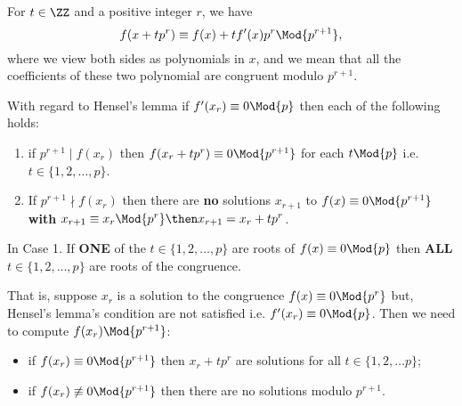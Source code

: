 \documentclass[12pt, a4paper]{article}
\begin{document}

\begin{lemma}
    For \(t\in \ZZ\) and a positive integer \(r\), we have
    \[f(x+tp^r) \equiv f(x)+tf'(x)p^r \Mod{p^{r+1}},\]
    where we view both sides as polynomials in \(x\), and we mean that all the coefficients of these two polynomial are congruent modulo \(p^{r+1}\).
\end{lemma}

\begin{mdthm}
    With regard to Hensel's lemma if \(f'(x_r) \equiv 0 \Mod{p}\) then each of the following holds:
    \begin{enumerate}
        \item if \(p^{r+1} \mid f(x_r)\) then \(f(x_r+tp^r) \equiv 0 \Mod{p^{r+1}}\) for each \(t \Mod{p}\) i.e. \(t \in \{1,2,\ldots, p\}\).
        \item If \(p^{r+1} \nmid f(x_r)\) then there are \textbf{no} solutions \(x_{r+1}\) to \(f(x) \equiv 0 \Mod{p^{r+1}}\) \textbf{with} \(x_{r+1} \equiv x_r \Mod{p^r} \then x_{r+1} = x_r +tp^r\).
    \end{enumerate}
\end{mdthm}

\begin{mdremark}
    In Case 1. If \textbf{ONE} of the \(t\in \{1,2,\ldots, p\}\) are roots of \(f(x) \equiv 0 \Mod{p}\) then \textbf{ALL} \(t \in \{1,2,\ldots, p\}\) are roots of the congruence.
\end{mdremark}

\pagebreak

\begin{mdnote}
    That is, suppose \(x_r\) is a solution to the congruence \(f(x)\equiv 0 \Mod{p^r}\) but, Hensel's lemma's condition are not satisfied i.e. \(f'(x_r) \equiv 0 \Mod{p}\). Then we need to compute \(f(x_r) \Mod{p^{r+1}}\):
    \begin{itemize}
        \item if \(f(x_r) \equiv 0 \Mod{p^{r+1}}\) then \(x_r+tp^r\) are solutions for all \(t \in \{1,2,\ldots p\}\);
        \item if \(f(x_r) \not\equiv 0 \Mod{p^{r+1}}\) then there are no solutions modulo \(p^{r+1}\).
    \end{itemize}
\end{mdnote}
\end{document}
